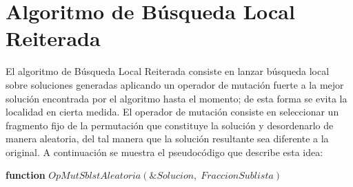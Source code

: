 \documentclass[11pt,a4paper]{article}
\begin{document}
\clearpage

\section{Algoritmo de Búsqueda Local Reiterada}

	\noindent El algoritmo de Búsqueda Local Reiterada consiste en lanzar búsqueda local sobre soluciones generadas aplicando un operador de mutación fuerte a la mejor solución encontrada por el algoritmo hasta el momento; de esta forma se evita la localidad en cierta medida. El operador de mutación consiste en seleccionar un fragmento fijo de la permutación que constituye la solución y desordenarlo de manera aleatoria, del tal manera que la solución resultante sea diferente a la original. A continuación se muestra el pseudocódigo que describe esta idea:
	
	\begin{algorithm}
		
		\textbf{function} $OpMutSblstAleatoria(\&Solucion,\;FraccionSublista)$
		
	\end{algorithm}
		
\end{document}
